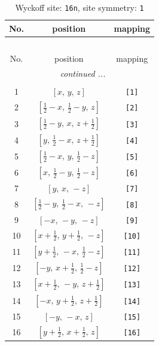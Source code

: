 \documentclass[fleqn,8pt]{jsarticle}
\begin{document}
\begin{longtable}{ccc}
\caption{Wyckoff site: {\tt 16n}, site symmetry: {\tt 1}}
 \\
 \hline \hline
No. & position & mapping \\ \hline \endfirsthead

\multicolumn{2}{l}{\tablename\ \thetable{}} \\
 \hline \hline
No. & position & mapping \\ \hline \endhead

 \hline \hline
\multicolumn{2}{r}{\footnotesize\it continued ...} \\ \endfoot

 \hline \hline
\multicolumn{2}{r}{} \\ \endlastfoot

1 & $\left[ x,\, y,\, z \right]$ & {\tt [1]} \\ \hline
2 & $\left[ \frac{1}{2} - x,\, \frac{1}{2} - y,\, z \right]$ & {\tt [2]} \\ \hline
3 & $\left[ \frac{1}{2} - y,\, x,\, z + \frac{1}{2} \right]$ & {\tt [3]} \\ \hline
4 & $\left[ y,\, \frac{1}{2} - x,\, z + \frac{1}{2} \right]$ & {\tt [4]} \\ \hline
5 & $\left[ \frac{1}{2} - x,\, y,\, \frac{1}{2} - z \right]$ & {\tt [5]} \\ \hline
6 & $\left[ x,\, \frac{1}{2} - y,\, \frac{1}{2} - z \right]$ & {\tt [6]} \\ \hline
7 & $\left[ y,\, x,\, - z \right]$ & {\tt [7]} \\ \hline
8 & $\left[ \frac{1}{2} - y,\, \frac{1}{2} - x,\, - z \right]$ & {\tt [8]} \\ \hline
9 & $\left[ - x,\, - y,\, - z \right]$ & {\tt [9]} \\ \hline
10 & $\left[ x + \frac{1}{2},\, y + \frac{1}{2},\, - z \right]$ & {\tt [10]} \\ \hline
11 & $\left[ y + \frac{1}{2},\, - x,\, \frac{1}{2} - z \right]$ & {\tt [11]} \\ \hline
12 & $\left[ - y,\, x + \frac{1}{2},\, \frac{1}{2} - z \right]$ & {\tt [12]} \\ \hline
13 & $\left[ x + \frac{1}{2},\, - y,\, z + \frac{1}{2} \right]$ & {\tt [13]} \\ \hline
14 & $\left[ - x,\, y + \frac{1}{2},\, z + \frac{1}{2} \right]$ & {\tt [14]} \\ \hline
15 & $\left[ - y,\, - x,\, z \right]$ & {\tt [15]} \\ \hline
16 & $\left[ y + \frac{1}{2},\, x + \frac{1}{2},\, z \right]$ & {\tt [16]} \\
\end{longtable}
\end{document}
